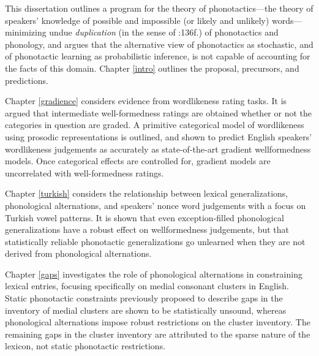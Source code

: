 This dissertation outlines a program for the theory of phonotactics---the theory of speakers' knowledge of possible and impossible (or likely and unlikely) words---minimizing undue \emph{duplication} (in the sense of \citealt{KK77}:136f.) of phonotactics and phonology, and argues that the alternative view of phonotactics as stochastic, and of phonotactic learning as probabilistic inference, is not capable of accounting for the facts of this domain.
Chapter \ref{intro} outlines the proposal, precursors, and predictions. 

Chapter \ref{gradience} considers evidence from wordlikeness rating tasks. It is argued that intermediate well-formedness ratings are obtained whether or not the categories in question are graded. A primitive categorical model of wordlikeness using prosodic representations is outlined, and shown to predict English speakers' wordlikeness judgements as accurately as state-of-the-art gradient wellformedness models. Once categorical effects are controlled for, gradient models are uncorrelated with well-formedness ratings.

Chapter \ref{turkish} considers the relationship between lexical generalizations, phonological alternations, and speakers' nonce word judgements with a focus on Turkish vowel patterns. It is shown that even exception-filled phonological generalizations have a robust effect on wellformedness judgements, but that statistically reliable phonotactic generalizations go unlearned when they are not derived from phonological alternations.

Chapter \ref{gaps} investigates the role of phonological alternations in constraining lexical entries, focusing specifically on medial consonant clusters in English. Static phonotactic constraints previously proposed to describe gaps in the inventory of medial clusters are shown to be statistically unsound, whereas phonological alternations impose robust restrictions on the cluster inventory. The remaining gaps in the cluster inventory are attributed to the sparse nature of the lexicon, not static phonotactic restrictions.
